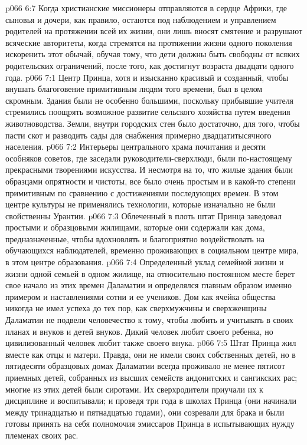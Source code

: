 \vs p066 6:7 Когда христианские миссионеры отправляются в сердце Африки, где сыновья и дочери, как правило, остаются под наблюдением и управлением родителей на протяжении всей их жизни, они лишь вносят смятение и разрушают всяческие авторитеты, когда стремятся на протяжении жизни одного поколения искоренить этот обычай, обучая тому, что дети должны быть свободны от всяких родительских ограничений, после того, как достигнут возраста двадцати одного года.
\vs p066 7:1 Центр Принца, хотя и изысканно красивый и созданный, чтобы внушать благоговение примитивным людям того времени, был в целом скромным. Здания были не особенно большими, поскольку прибывшие учителя стремились поощрять возможное развитие сельского хозяйства путем введения животноводства. Земли, внутри городских стен было достаточно, для того, чтобы пасти скот и разводить сады для снабжения примерно двадцатитысячного населения.
\vs p066 7:2 Интерьеры центрального храма почитания и десяти особняков советов, где заседали руководители\hyp{}сверхлюди, были по\hyp{}настоящему прекрасными творениями искусства. И несмотря на то, что жилые здания были образцами опрятности и чистоты, все было очень простым и в какой\hyp{}то степени примитивным по сравнению с достижениями последующих времен. В этом центре культуры не применялись технологии, которые изначально не были свойственны Урантии.
\vs p066 7:3 Облеченный в плоть штат Принца заведовал простыми и образцовыми жилищами, которые они содержали как дома, предназначенные, чтобы вдохновлять и благоприятно воздействовать на обучающихся наблюдателей, временно проживающих в социальном центре мира, в этом центре образования.
\vs p066 7:4 \pc Определенный уклад семейной жизни и жизни одной семьей в одном жилище, на относительно постоянном месте берет свое начало из этих времен Даламатии и определялся главным образом именно примером и наставлениями сотни и ее учеников. Дом как ячейка общества никогда не имел успеха до тех пор, как сверхмужчины и сверхженщины Даламатии не подвели человечество к тому, чтобы любить и учитывать в своих планах и внуков и детей внуков. Дикий человек любит своего ребенка, но цивилизованный человек любит также своего внука.
\vs p066 7:5 Штат Принца жил вместе как отцы и матери. Правда, они не имели своих собственных детей, но в пятидесяти образцовых домах Даламатии всегда проживало не менее пятисот приемных детей, собранных из высших семейств андонитских и сангикских рас; многие из этих детей были сиротами. Их сверхродители приучали их к дисциплине и воспитывали; и проведя три года в школах Принца (они начинали между тринадцатью и пятнадцатью годами), они созревали для брака и были готовы принять на себя полномочия эмиссаров Принца в испытывающих нужду племенах своих рас.
